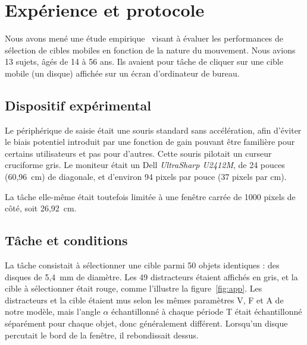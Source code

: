 \section{Expérience et protocole}
	Nous avons mené une étude empirique~\cite{kouyoumdjian2015characterizing} visant à évaluer les performances de sélection de cibles mobiles en fonction de la nature du mouvement. Nous avions 13 sujets, âgés de 14 à 56 ans. Ils avaient pour tâche de cliquer sur une cible mobile (un disque) affichée sur un écran d'ordinateur de bureau.

	\subsection{Dispositif expérimental}
	Le périphérique de saisie était une souris standard sans accélération, afin d'éviter le biais potentiel introduit par une fonction de gain pouvant être familière pour certains utilisateurs et pas pour d'autres. Cette souris pilotait un curseur cruciforme gris. Le moniteur était un Dell \emph{UltraSharp U2412M}\footnotemark{}, de 24 pouces (60,96~cm) de diagonale, et d'environ 94 pixels par pouce (37 pixels par cm).
	
	La tâche elle-même était toutefois limitée à une fenêtre carrée de 1000 pixels de côté, soit 26,92~cm.


	\subsection{Tâche et conditions}
	La tâche consistait à sélectionner une cible parmi 50 objets identiques : des disques de 5,4~mm de diamètre. Les 49 \og distracteurs \fg{} étaient affichés en gris, et la cible à sélectionner était rouge, comme l'illustre la figure~\ref{fig:app}. Les distracteurs et la cible étaient mus selon les mêmes paramètres V, F et A de notre modèle, mais l'angle $\alpha$ échantillonné à chaque période T était échantillonné séparément pour chaque objet, donc généralement différent. Lorsqu'un disque \og percutait \fg{} le bord de la fenêtre, il \og rebondissait \fg{} dessus.
	
